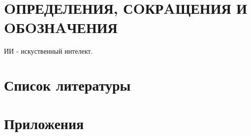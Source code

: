 \newpage
{}
\section{OПРЕДЕЛЕНИЯ, СOКРAЩЕНИЯ И OБOЗНAЧЕНИЯ}

ИИ - искуственный интелект.

\newpage
{}
\tableofcontents





\newpage
{}
\section{Список литературы}

\newpage

\section{Приложения}


